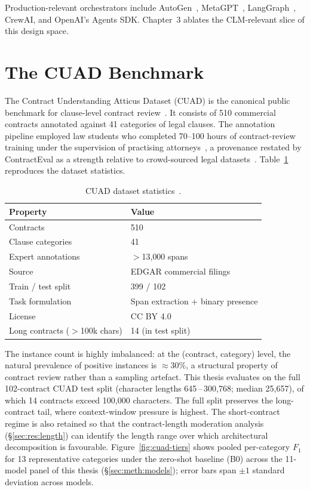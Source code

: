 Production-relevant orchestrators include AutoGen~\cite{wu2023autogen},
MetaGPT~\cite{hong2024metagpt}, LangGraph~\cite{langgraph2024}, CrewAI, and
OpenAI's Agents SDK. Chapter~3 ablates the CLM-relevant slice of this design
space.

\section{The CUAD Benchmark}\label{sec:lit:cuad}

The Contract Understanding Atticus Dataset (CUAD) is the canonical public benchmark
for clause-level contract review~\cite{hendrycks2021cuad}. It consists of 510
commercial contracts annotated against 41 categories of legal clauses. The annotation
pipeline employed law students who completed 70--100 hours of contract-review training
under the supervision of practising attorneys~\cite{hendrycks2021cuad}, a provenance
restated by ContractEval as a strength relative to crowd-sourced legal
datasets~\cite{liu2025contracteval}. Table~\ref{tab:cuad-stats} reproduces the
dataset statistics.

\begin{table}[h]
  \centering
  \small
  \caption{CUAD dataset statistics~\cite{hendrycks2021cuad}.}
  \label{tab:cuad-stats}
  \begin{tabular}{ll}
    \toprule
    \textbf{Property} & \textbf{Value} \\
    \midrule
    Contracts            & 510 \\
    Clause categories    & 41 \\
    Expert annotations   & $>$13{,}000 spans \\
    Source               & EDGAR commercial filings \\
    Train / test split   & 399 / 102 \\
    Task formulation     & Span extraction + binary presence \\
    License              & CC BY 4.0 \\
    Long contracts ($>$100k chars) & 14 (in test split) \\
    \bottomrule
  \end{tabular}
\end{table}

The instance count is highly imbalanced: at the (contract, category) level, the
natural prevalence of positive instances is $\approx\!30\%$, a structural property
of contract review rather than a sampling artefact. This thesis evaluates on the
full 102-contract CUAD test split (character lengths 645\,--\,300{,}768; median
25{,}657), of which 14 contracts exceed 100{,}000 characters. The full split
preserves the long-contract tail, where context-window pressure is highest.
The short-contract regime is also retained so that the contract-length
moderation analysis (\S\ref{sec:res:length}) can identify the length range
over which architectural decomposition is favourable.
Figure~\ref{fig:cuad-tiers} shows pooled per-category $F_1$ for 13
representative categories under the zero-shot baseline (B0) across the
11-model panel of this thesis (\S\ref{sec:meth:models}); error bars span
$\pm 1$ standard deviation across models.

